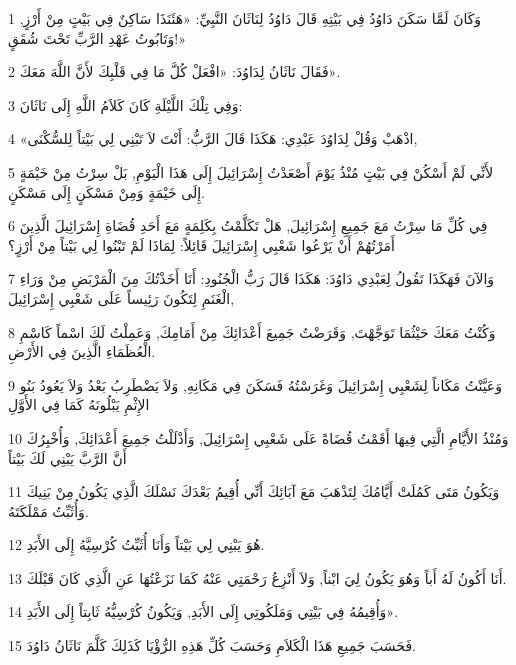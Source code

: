 \par 1 وَكَانَ لَمَّا سَكَنَ دَاوُدُ فِي بَيْتِهِ قَالَ دَاوُدُ لِنَاثَانَ النَّبِيِّ: «هَئَنَذَا سَاكِنٌ فِي بَيْتٍ مِنْ أَرْزٍ, وَتَابُوتُ عَهْدِ الرَّبِّ تَحْتَ شُقَقٍ!»
\par 2 فَقَالَ نَاثَانُ لِدَاوُدَ: «افْعَلْ كُلَّ مَا فِي قَلْبِكَ لأَنَّ اللَّهَ مَعَكَ».
\par 3 وَفِي تِلْكَ اللَّيْلَةِ كَانَ كَلاَمُ اللَّهِ إِلَى نَاثَانَ:
\par 4 «اذْهَبْ وَقُلْ لِدَاوُدَ عَبْدِي: هَكَذَا قَالَ الرَّبُّ: أَنْتَ لاَ تَبْنِي لِي بَيْتاً لِلسُّكْنَى,
\par 5 لأَنِّي لَمْ أَسْكُنْ فِي بَيْتٍ مُنْذُ يَوْمَ أَصْعَدْتُ إِسْرَائِيلَ إِلَى هَذَا الْيَوْمِ, بَلْ سِرْتُ مِنْ خَيْمَةٍ إِلَى خَيْمَةٍ وَمِنْ مَسْكَنٍ إِلَى مَسْكَنٍ.
\par 6 فِي كُلِّ مَا سِرْتُ مَعَ جَمِيعِ إِسْرَائِيلَ, هَلْ تَكَلَّمْتُ بِكَلِمَةٍ مَعَ أَحَدِ قُضَاةِ إِسْرَائِيلَ الَّذِينَ أَمَرْتُهُمْ أَنْ يَرْعُوا شَعْبِي إِسْرَائِيلَ قَائِلاً: لِمَاذَا لَمْ تَبْنُوا لِي بَيْتاً مِنْ أَرْزٍ؟
\par 7 وَالآنَ فَهَكَذَا تَقُولُ لِعَبْدِي دَاوُدَ: هَكَذَا قَالَ رَبُّ الْجُنُودِ: أَنَا أَخَذْتُكَ مِنَ الْمَرْبَضِ مِنْ وَرَاءِ الْغَنَمِ لِتَكُونَ رَئِيساً عَلَى شَعْبِي إِسْرَائِيلَ,
\par 8 وَكُنْتُ مَعَكَ حَيْثُمَا تَوَجَّهْتَ, وَقَرَضْتُ جَمِيعَ أَعْدَائِكَ مِنْ أَمَامِكَ, وَعَمِلْتُ لَكَ اسْماً كَاسْمِ الْعُظَمَاءِ الَّذِينَ فِي الأَرْضِ.
\par 9 وَعَيَّنْتُ مَكَاناً لِشَعْبِي إِسْرَائِيلَ وَغَرَسْتُهُ فَسَكَنَ فِي مَكَانِهِ, وَلاَ يَضْطَرِبُ بَعْدُ وَلاَ يَعُودُ بَنُو الإِثْمِ يَبْلُونَهُ كَمَا فِي الأَوَّلِ
\par 10 وَمُنْذُ الأَيَّامِ الَّتِي فِيهَا أَقَمْتُ قُضَاةً عَلَى شَعْبِي إِسْرَائِيلَ, وَأَذْلَلْتُ جَمِيعَ أَعْدَائِكَ, وَأُخْبِرُكَ أَنَّ الرَّبَّ يَبْنِي لَكَ بَيْتاً
\par 11 وَيَكُونُ مَتَى كَمُلَتْ أَيَّامُكَ لِتَذْهَبَ مَعَ آبَائِكَ أَنِّي أُقِيمُ بَعْدَكَ نَسْلَكَ الَّذِي يَكُونُ مِنْ بَنِيكَ وَأُثَبِّتُ مَمْلَكَتَهُ.
\par 12 هُوَ يَبْنِي لِي بَيْتاً وَأَنَا أُثَبِّتُ كُرْسِيَّهُ إِلَى الأَبَدِ.
\par 13 أَنَا أَكُونُ لَهُ أَباً وَهُوَ يَكُونُ لِيَ ابْناً, وَلاَ أَنْزِعُ رَحْمَتِي عَنْهُ كَمَا نَزَعْتُهَا عَنِ الَّذِي كَانَ قَبْلَكَ.
\par 14 وَأُقِيمُهُ فِي بَيْتِي وَمَلَكُوتِي إِلَى الأَبَدِ, وَيَكُونُ كُرْسِيُّهُ ثَابِتاً إِلَى الأَبَدِ».
\par 15 فَحَسَبَ جَمِيعِ هَذَا الْكَلاَمِ وَحَسَبَ كُلِّ هَذِهِ الرُّؤْيَا كَذَلِكَ كَلَّمَ نَاثَانُ دَاوُدَ.

